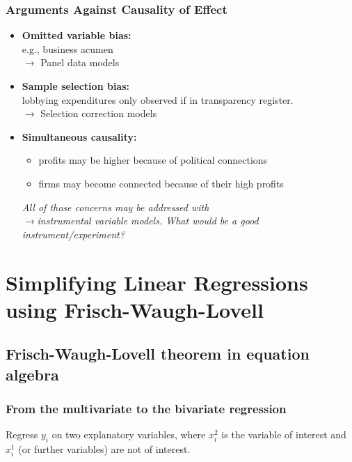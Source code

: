 \documentclass[a4paper,12pt]{article}
\def\emph{\textit}
\begin{document}
\subsubsection*{Arguments \textbf{Against} Causality of Effect}

\begin{itemize}
\item \textbf{Omitted variable bias:}\\ e.g., business acumen\\
$\rightarrow$ Panel data models
\item \textbf{Sample selection bias:}\\ lobbying expenditures only observed if in transparency register.\\
$\rightarrow$ Selection correction models
\item \textbf{Simultaneous causality:}
\begin{itemize}
	\item profits may be higher because of political connections
  \item firms may become connected because of their high profits
\end{itemize}

\emph{All of those concerns may be addressed with}\\ $\rightarrow$\emph{instrumental variable models. What would be a good instrument/experiment?}
\end{itemize}

\clearpage

\section{Simplifying Linear Regressions using Frisch-Waugh-Lovell}
\label{Simplifying Linear Regressions using Frisch-Waugh-Lovell}

\subsection{Frisch-Waugh-Lovell theorem in equation algebra}



\subsubsection*{ From the multivariate to the bivariate regression}
Regress $y_i$ on two explanatory variables, where $x^{2}_i$ is the variable of interest and $x^{\text{1}}_i$ (or further variables) are not of interest.
\end{document}
